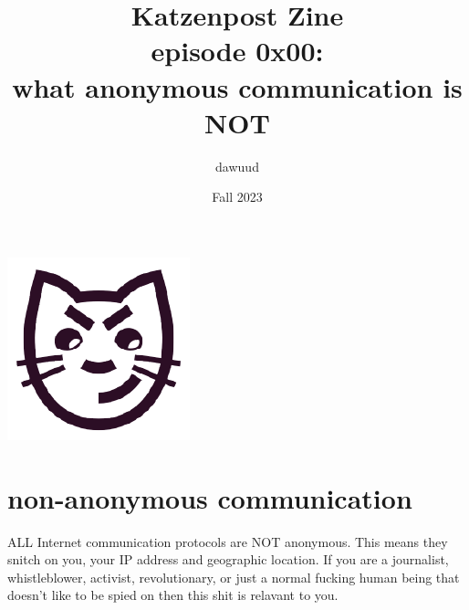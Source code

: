 \documentclass[statementpaper,oneside,article,14pt]{memoir}
\newcommand{\BackgroundPic}[1]{%
\put(0,0){%
\parbox[b][\paperheight]{\paperwidth}{%
\vfill
\centering
{\transparent{0.4} \texttt{[image: \#1]}}%
\vfill
}}}
\begin{document}

\title{Katzenpost Zine \\
  episode 0x00: \\
  what anonymous communication is NOT }
\author{dawuud}
\date{Fall 2023}

\begingroup
\let\cleardoublepage\clearpage


\begin{titlingpage}
\maketitle

\begin{center}
  \includegraphics[scale=.2]{katzenpost_logo} \\
\end{center}

\end{titlingpage}

\endgroup




\section{non-anonymous communication}

ALL Internet communication protocols are NOT anonymous. This means
they snitch on you, your IP address and geographic location. If you
are a journalist, whistleblower, activist, revolutionary, or just a
normal fucking human being that doesn't like to be spied on then this
shit is relavant to you.

\newpage
\end{document}
